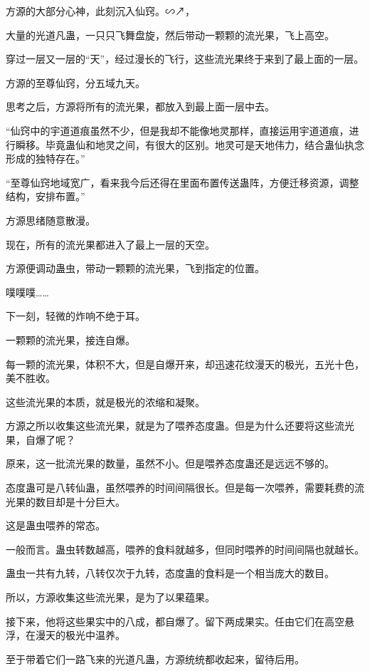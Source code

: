
\begin{this_body}

方源的大部分心神，此刻沉入仙窍。∽↗，

大量的光道凡蛊，一只只飞舞盘旋，然后带动一颗颗的流光果，飞上高空。

穿过一层又一层的“天”，经过漫长的飞行，这些流光果终于来到了最上面的一层。

方源的至尊仙窍，分五域九天。

思考之后，方源将所有的流光果，都放入到最上面一层中去。

“仙窍中的宇道道痕虽然不少，但是我却不能像地灵那样，直接运用宇道道痕，进行瞬移。毕竟蛊仙和地灵之间，有很大的区别。地灵可是天地伟力，结合蛊仙执念形成的独特存在。”

“至尊仙窍地域宽广，看来我今后还得在里面布置传送蛊阵，方便迁移资源，调整结构，安排布置。”

方源思绪随意散漫。

现在，所有的流光果都进入了最上一层的天空。

方源便调动蛊虫，带动一颗颗的流光果，飞到指定的位置。

噗噗噗……

下一刻，轻微的炸响不绝于耳。

一颗颗的流光果，接连自爆。

每一颗的流光果，体积不大，但是自爆开来，却迅速花纹漫天的极光，五光十色，美不胜收。

这些流光果的本质，就是极光的浓缩和凝聚。

方源之所以收集这些流光果，就是为了喂养态度蛊。但是为什么还要将这些流光果，自爆了呢？

原来，这一批流光果的数量，虽然不小。但是喂养态度蛊还是远远不够的。

态度蛊可是八转仙蛊，虽然喂养的时间间隔很长。但是每一次喂养，需要耗费的流光果的数目却是十分巨大。

这是蛊虫喂养的常态。

一般而言。蛊虫转数越高，喂养的食料就越多，但同时喂养的时间间隔也就越长。

蛊虫一共有九转，八转仅次于九转，态度蛊的食料是一个相当庞大的数目。

所以，方源收集这些流光果，是为了以果蕴果。

接下来，他将这些果实中的八成，都自爆了。留下两成果实。任由它们在高空悬浮，在漫天的极光中温养。

至于带着它们一路飞来的光道凡蛊，方源统统都收起来，留待后用。


\end{this_body}
